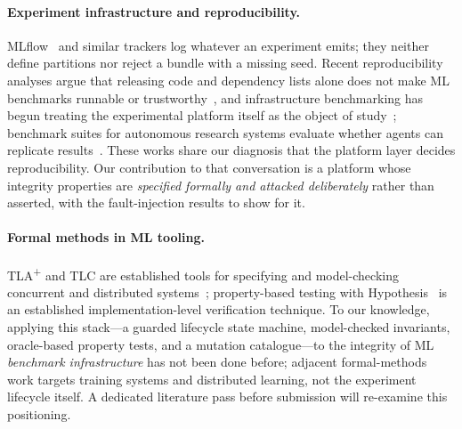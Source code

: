 \paragraph{Experiment infrastructure and reproducibility.}
MLflow~\cite{mlflow} and similar trackers log whatever an experiment emits;
they neither define partitions nor reject a bundle with a missing seed.
Recent reproducibility analyses argue that releasing code and dependency
lists alone does not make ML benchmarks runnable or
trustworthy~\cite{lyu2026reproducibility}, and infrastructure benchmarking
has begun treating the experimental platform itself as the object of
study~\cite{kramer2025mlops}; benchmark suites for autonomous research
systems evaluate whether agents can replicate results~\cite{mlreplicate2026}.
These works share our diagnosis that the platform layer decides
reproducibility. Our contribution to that conversation is a platform whose
integrity properties are \emph{specified formally and attacked deliberately}
rather than asserted, with the fault-injection results to show for it.

\paragraph{Formal methods in ML tooling.}
TLA\textsuperscript{+} and TLC are established tools for specifying and
model-checking concurrent and distributed systems~\cite{lamport2002specifying};
property-based testing with Hypothesis~\cite{hypothesis} is an established
implementation-level verification technique. To our knowledge, applying
this stack---a guarded lifecycle state machine, model-checked invariants,
oracle-based property tests, and a mutation catalogue---to the integrity of
ML \emph{benchmark infrastructure} has not been done before; adjacent
formal-methods work targets training systems and distributed learning, not
the experiment lifecycle itself. A dedicated literature pass before
submission will re-examine this positioning.
